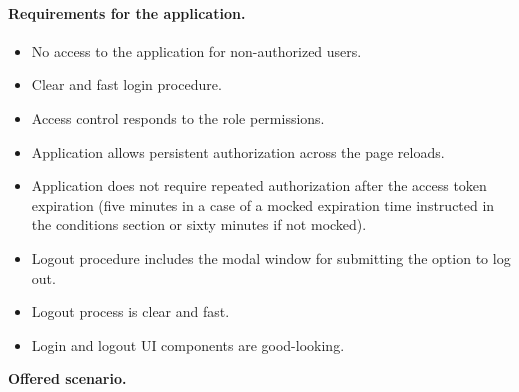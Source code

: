 \paragraph*{Requirements for the application.} 
\begin{itemize}
    \item No access to the application for non-authorized users.
    \item Clear and fast login procedure.
    \item Access control responds to the role permissions.
    \item Application allows persistent authorization across the page reloads.
    \item Application does not require repeated authorization after the access token expiration (five minutes in a case of a mocked expiration time instructed in the conditions section or sixty minutes if not mocked).
    \item Logout procedure includes the modal window for submitting the option to log out.
    \item Logout process is clear and fast.
    \item Login and logout UI components are good-looking.
\end{itemize}



\newpage
\noindent \textbf{Offered scenario.} 

